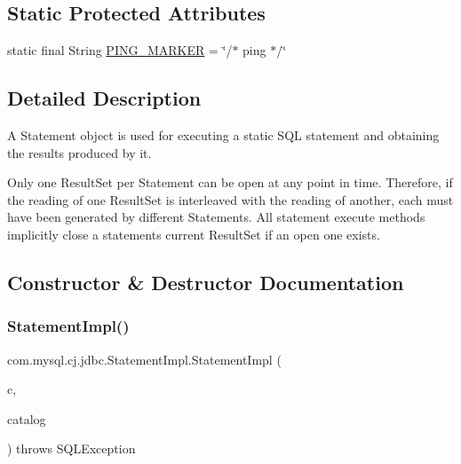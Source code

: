 \subsection*{Static Protected Attributes}
\begin{DoxyCompactItemize}
\item 
static final String \mbox{\hyperlink{classcom_1_1mysql_1_1cj_1_1jdbc_1_1_statement_impl_ab525dfdaa9be2464103f3c7bb8f0ffdc}{P\+I\+N\+G\+\_\+\+M\+A\+R\+K\+ER}} = \char`\"{}/$\ast$ ping $\ast$/\char`\"{}
\end{DoxyCompactItemize}


\subsection{Detailed Description}
A Statement object is used for executing a static S\+QL statement and obtaining the results produced by it.

Only one Result\+Set per Statement can be open at any point in time. Therefore, if the reading of one Result\+Set is interleaved with the reading of another, each must have been generated by different Statements. All statement execute methods implicitly close a statement\textquotesingle{}s current Result\+Set if an open one exists. 

\subsection{Constructor \& Destructor Documentation}
\mbox{\label{classcom_1_1mysql_1_1cj_1_1jdbc_1_1_statement_impl_ab7415feadb30fb623edffd1b9bd40d5d}} 
\subsubsection{\texorpdfstring{Statement\+Impl()}{StatementImpl()}}
{\footnotesize\ttfamily com.\+mysql.\+cj.\+jdbc.\+Statement\+Impl.\+Statement\+Impl (\begin{DoxyParamCaption}\item[{\mbox{\hyperlink{interfacecom_1_1mysql_1_1cj_1_1jdbc_1_1_jdbc_connection}{Jdbc\+Connection}}}]{c,  }\item[{String}]{catalog }\end{DoxyParamCaption}) throws S\+Q\+L\+Exception}

